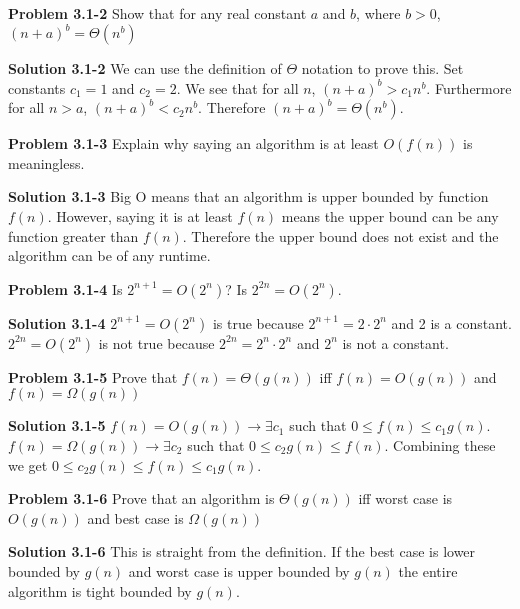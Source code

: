 \documentclass{article}
\begin{document}
\hrulefill

\medskip

\textbf{Problem 3.1-2} Show that for any real constant $a$ and $b$, where $b > 0$, $(n+a)^b = \Theta(n^b)$

\medskip

\textbf{Solution 3.1-2} We can use the definition of $\Theta$ notation to prove this. Set constants $c_1 = 1$ and $c_2 = 2$. We see that for all $n$, $(n+a)^b > c_1n^b$. Furthermore for all $n>a$, $(n+a)^b < c_2n^b$. Therefore $(n+a)^b = \Theta(n^b)$.

\hrulefill

\medskip

\textbf{Problem 3.1-3} Explain why saying an algorithm is at least $O(f(n))$ is meaningless.

\medskip

\textbf{Solution 3.1-3} Big O means that an algorithm is upper bounded by function $f(n)$. However, saying it is at least $f(n)$ means the upper bound can be any function greater than $f(n)$. Therefore the upper bound does not exist and the algorithm can be of any runtime.

\hrulefill

\medskip

\textbf{Problem 3.1-4} Is $2^{n+1} = O(2^n)$? Is $2^{2n} = O(2^n)$.

\medskip

\textbf{Solution 3.1-4} $2^{n+1} = O(2^n)$ is true because $2^{n+1} = 2 \cdot 2^n$ and 2 is a constant. $2^{2n} = O(2^n)$ is not true because $2^{2n} = 2^n \cdot 2^n$ and $2^n$ is not a constant.

\hrulefill

\medskip

\textbf{Problem 3.1-5} Prove that $f(n) = \Theta(g(n))$ iff $f(n) = O(g(n))$ and $f(n) = \Omega(g(n))$

\medskip

\textbf{Solution 3.1-5} $f(n) = O(g(n)) \rightarrow \exists c_1$ such that $0 \leq f(n) \leq c_1g(n)$. $f(n) = \Omega(g(n)) \rightarrow \exists c_2$ such that $0 \leq c_2g(n) \leq f(n)$. Combining these we get $0 \leq c_2g(n) \leq f(n) \leq c_1g(n)$.

\hrulefill

\textbf{Problem 3.1-6} Prove that an algorithm is $\Theta(g(n))$ iff worst case is $O(g(n))$ and best case is $\Omega(g(n))$

\medskip

\textbf{Solution 3.1-6} This is straight from the definition. If the best case is lower bounded by $g(n)$ and worst case is upper bounded by $g(n)$ the entire algorithm is tight bounded by $g(n)$.
\end{document}
